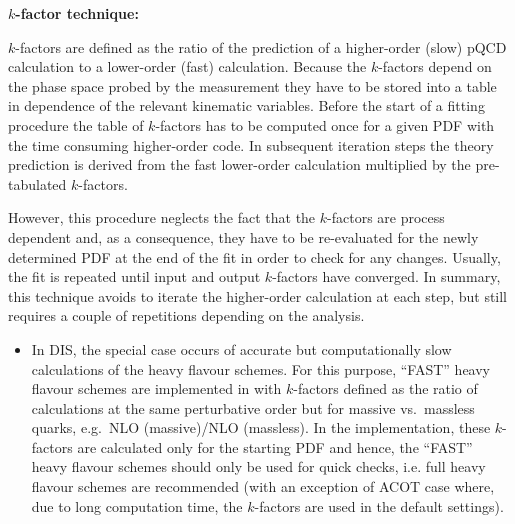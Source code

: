 \begin{description}
\item{\bf$k$-factor technique:}

  $k$-factors are defined as the ratio of the prediction of a
  higher-order (slow) pQCD calculation to a lower-order (fast)
  calculation. Because the $k$-factors depend on the phase space
  probed by the measurement they have to be stored into a table in
  dependence of the relevant kinematic variables. Before the start of
  a fitting procedure the table of $k$-factors has to be computed once
  for a given PDF with the time consuming higher-order code. In
  subsequent iteration steps the theory prediction is derived from the
  fast lower-order calculation multiplied by the pre-tabulated
  $k$-factors.

  However, this procedure neglects the fact that the $k$-factors are
  process dependent and, 
  as a consequence, they have to be re-evaluated
  for the newly determined PDF at the end of the fit in order to check
  for any changes. Usually, the fit is repeated until input and output
  $k$-factors have converged. In summary, this technique avoids to
  iterate the higher-order calculation at each step, but still
  requires a couple of repetitions depending on the analysis.


\begin{itemize}
%
  \item In DIS, the special case occurs of accurate but
    computationally slow calculations of the heavy flavour schemes.
    For this purpose, ``FAST'' heavy flavour schemes are implemented
    in \fitter with $k$-factors defined as the ratio of
    calculations at the same perturbative order but for massive vs.\
    massless quarks, e.g.\ NLO (massive)/NLO (massless).
    In the \fitter
    implementation, these $k$-factors are calculated only for the
    starting PDF and hence, the ``FAST'' heavy flavour schemes should
    only be used for quick checks, i.e. full heavy flavour schemes
    are recommended
    (with an exception of ACOT case 
    where, due to long computation time, the $k$-factors are used in 
    the default settings).


\end{itemize}
\end{description}
